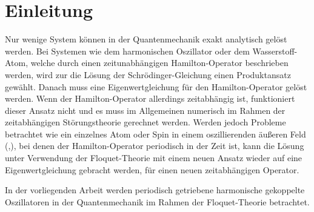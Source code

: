\chapter{Einleitung}
\iffalse
Hier folgt eine kurze Einleitung in die Thematik der Bachelorarbeit.
Die Einleitung muss kurz sein, damit die vorgegebene Gesamtlänge der
Arbeit von 25 Seiten nicht überschritten wird.
Die Beschränkung der Seitenzahl sollte man ernst nehmen,
da Überschreitung zu Abzügen in der Note führen kann.
Um der Längenbeschränkung zu genügen, darf auch nicht an der Schriftgröße,
dem Zeilenabstand oder dem Satzspiegel (bedruckte Fläche der Seite) manipuliert werden.



nur wenige systeme exakt loesbar in qm harm oszi, wasserstoff. bei zeitabh hamiltonop keine stat schroed glgl  (eigenwertglg), gelingt aber bei periodischen mit floqet thoerie
\fi

Nur wenige System können in der Quantenmechanik exakt analytisch gelöst werden.
Bei Systemen wie dem harmonischen Oszillator oder dem Wasserstoff-Atom, welche durch einen zeitunabhängigen Hamilton-Operator beschrieben werden, wird zur die Lösung der Schrödinger-Gleichung einen Produktansatz gewählt.
Danach muss eine Eigenwertgleichung für den Hamilton-Operator gelöst werden.
Wenn der Hamilton-Operator allerdings zeitabhängig ist, funktioniert dieser Ansatz nicht und es muss im Allgemeinen numerisch im Rahmen der zeitabhängigen Störungstheorie gerechnet werden.
Werden jedoch Probleme betrachtet wie ein einzelnes Atom oder Spin in einem oszillierenden äußeren Feld (\cite{haengi},\cite{sherly}), bei denen der Hamilton-Operator periodisch in der Zeit ist, kann die Lösung unter Verwendung der Floquet-Theorie mit einem neuen Ansatz wieder auf eine Eigenwertgleichung gebracht werden, für einen neuen zeitabhängigen Operator.

In der vorliegenden Arbeit werden periodisch getriebene harmonische gekoppelte Oszillatoren in der Quantenmechanik im Rahmen der Floquet-Theorie betrachtet. %

